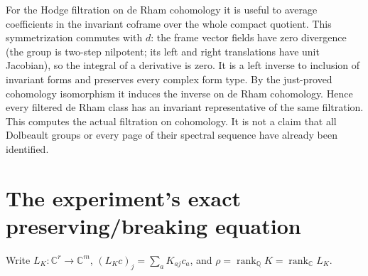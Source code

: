 \documentclass[11pt]{article}
\newcommand{\Q}{\mathbb Q}
\newcommand{\C}{\mathbb C}
\newcommand{\rank}{\operatorname{rank}}
\begin{document}
For the Hodge filtration on de Rham cohomology it is useful to average
coefficients in the invariant coframe over the whole compact quotient.
This symmetrization commutes with $d$: the frame vector fields have
zero divergence (the group is two-step nilpotent; its left and right
translations have unit Jacobian), so the integral of a derivative is zero.
It is a left inverse to inclusion of invariant forms and preserves every
complex form type. By the just-proved cohomology isomorphism it induces
the inverse on de Rham cohomology. Hence every filtered de Rham class has
an invariant representative of the same filtration. This computes the
actual filtration on cohomology. It is not a claim that all Dolbeault
groups or every page of their spectral sequence have already been identified.

\section{The experiment's exact preserving/breaking equation}
Write $L_K:\C^r\to\C^m$, $(L_Kc)_j=\sum_a K_{aj}c_a$, and
$\rho=\rank_\Q K=\rank_\C L_K$.
\end{document}
